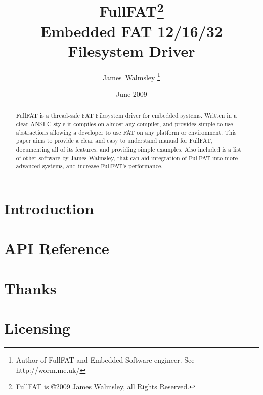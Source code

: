 \documentclass[final,a4paper,12pt]{article}
\begin{document}
\title{\Huge{FullFAT\footnote {FullFAT is \copyright  2009 James Walmsley, all Rights Reserved.}}\\\Large{Embedded FAT 12/16/32 Filesystem Driver}}
\author{James~Walmsley \thanks{Author of FullFAT and Embedded Software engineer. See http://worm.me.uk/}}
\date{June 2009}
\maketitle

\begin {abstract} 
FullFAT is a thread-safe FAT Filesystem driver for embedded systems. Written in a clear ANSI C style it compiles on almost any compiler, and provides simple to use abstractions allowing a developer to use FAT on any platform or environment. This paper aims to provide a clear and easy to understand manual for FullFAT, documenting all of its features, and providing simple examples. Also included is a list of other software by James Walmsley, that can aid integration of FullFAT into more advanced systems, and increase FullFAT's performance.
\end {abstract}

\newpage
\tableofcontents

\newpage
\section{Introduction}


\newpage
\section{API Reference}


\newpage
\section{Thanks}


\newpage
\section{Licensing}

\end{document}
